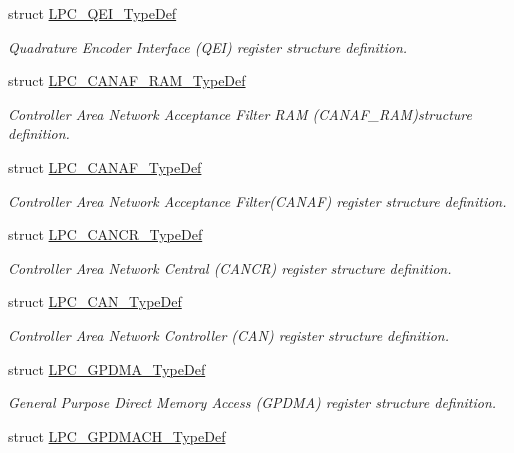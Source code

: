 \begin{DoxyCompactItemize}
struct \hyperlink{struct_l_p_c___q_e_i___type_def}{\-L\-P\-C\-\_\-\-Q\-E\-I\-\_\-\-Type\-Def}
\begin{DoxyCompactList}\small\item\em \-Quadrature \-Encoder \-Interface (\-Q\-E\-I) register structure definition. \end{DoxyCompactList}\item 
struct \hyperlink{struct_l_p_c___c_a_n_a_f___r_a_m___type_def}{\-L\-P\-C\-\_\-\-C\-A\-N\-A\-F\-\_\-\-R\-A\-M\-\_\-\-Type\-Def}
\begin{DoxyCompactList}\small\item\em \-Controller \-Area \-Network \-Acceptance \-Filter \-R\-A\-M (\-C\-A\-N\-A\-F\-\_\-\-R\-A\-M)structure definition. \end{DoxyCompactList}\item 
struct \hyperlink{struct_l_p_c___c_a_n_a_f___type_def}{\-L\-P\-C\-\_\-\-C\-A\-N\-A\-F\-\_\-\-Type\-Def}
\begin{DoxyCompactList}\small\item\em \-Controller \-Area \-Network \-Acceptance \-Filter(\-C\-A\-N\-A\-F) register structure definition. \end{DoxyCompactList}\item 
struct \hyperlink{struct_l_p_c___c_a_n_c_r___type_def}{\-L\-P\-C\-\_\-\-C\-A\-N\-C\-R\-\_\-\-Type\-Def}
\begin{DoxyCompactList}\small\item\em \-Controller \-Area \-Network \-Central (\-C\-A\-N\-C\-R) register structure definition. \end{DoxyCompactList}\item 
struct \hyperlink{struct_l_p_c___c_a_n___type_def}{\-L\-P\-C\-\_\-\-C\-A\-N\-\_\-\-Type\-Def}
\begin{DoxyCompactList}\small\item\em \-Controller \-Area \-Network \-Controller (\-C\-A\-N) register structure definition. \end{DoxyCompactList}\item 
struct \hyperlink{struct_l_p_c___g_p_d_m_a___type_def}{\-L\-P\-C\-\_\-\-G\-P\-D\-M\-A\-\_\-\-Type\-Def}
\begin{DoxyCompactList}\small\item\em \-General \-Purpose \-Direct \-Memory \-Access (\-G\-P\-D\-M\-A) register structure definition. \end{DoxyCompactList}\item 
struct \hyperlink{struct_l_p_c___g_p_d_m_a_c_h___type_def}{\-L\-P\-C\-\_\-\-G\-P\-D\-M\-A\-C\-H\-\_\-\-Type\-Def}

\end{DoxyCompactItemize}
